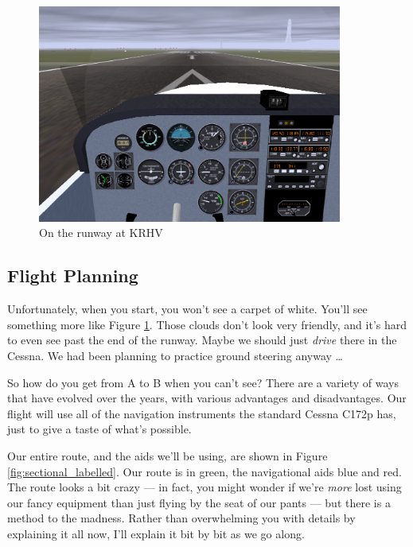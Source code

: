 

\begin{figure}
  \begin{center}
    \includegraphics[width=10cm]{img/KRHV}
    \caption{On the runway at KRHV}
    \label{fig:KRHV}
  \end{center}
\end{figure}

\subsection{Flight Planning}

Unfortunately, when you start, you won't see a carpet of white.
You'll see something more like Figure \ref{fig:KRHV}.  Those clouds
don't look very friendly, and it's hard to even see past the end of
the runway.  Maybe we should just \emph{drive} there in the Cessna.
We had been planning to practice ground steering anyway \ldots{}

So how do you get from A to B when you can't see?  There are a variety
of ways that have evolved over the years, with various advantages and
disadvantages.  Our flight will use all of the navigation instruments
the standard Cessna C172p has, just to give a taste of what's
possible.

Our entire route, and the aids we'll be using, are shown in
Figure \ref{fig:sectional_labelled}.  Our route is in green, the
navigational aids blue and red.  The route looks a bit crazy --- in
fact, you might wonder if we're \emph{more} lost using our fancy
equipment than just flying by the seat of our pants --- but there is a
method to the madness.  Rather than overwhelming you with details by
explaining it all now, I'll explain it bit by bit as we go along.

